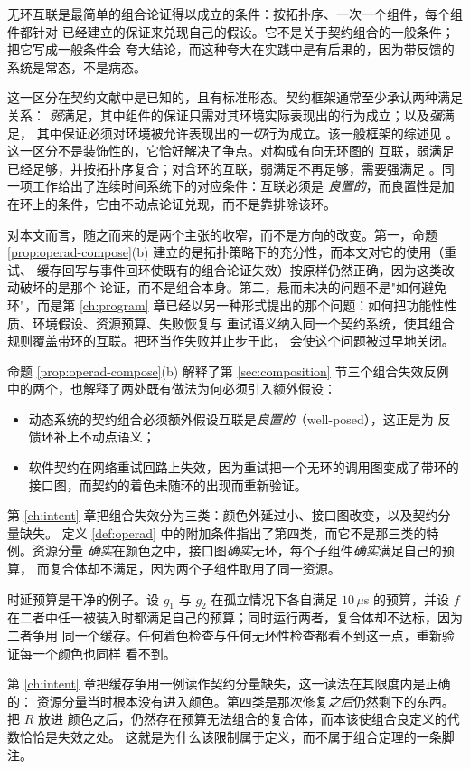 \begin{remark}\label{rmk:cycles-composable}
无环互联是最简单的组合论证得以成立的条件：按拓扑序、一次一个组件，每个组件都针对
已经建立的保证来兑现自己的假设。它不是关于契约组合的一般条件；把它写成一般条件会
夸大结论，而这种夸大在实践中是有后果的，因为带反馈的系统是常态，不是病态。

这一区分在契约文献中是已知的，且有标准形态。契约框架通常至少承认两种满足关系：
\emph{弱}满足，其中组件的保证只需对其环境实际表现出的行为成立；以及\emph{强}满足，
其中保证必须对环境被允许表现出的\emph{一切}行为成立。该一般框架的综述见
\cite{benveniste2018}。这一区分不是装饰性的，它恰好解决了争点。对构成有向无环图的
互联，弱满足已经足够，并按拓扑序复合；对含环的互联，弱满足不再足够，需要强满足
\cite{agcontracts2021}。同一项工作给出了连续时间系统下的对应条件：互联必须是
\emph{良置的}，而良置性是加在环上的条件，它由不动点论证兑现，而不是靠排除该环。

对本文而言，随之而来的是两个主张的收窄，而不是方向的改变。第一，命题
\ref{prop:operad-compose}(b) 建立的是拓扑策略下的充分性，而本文对它的使用（重试、
缓存回写与事件回环使既有的组合论证失效）按原样仍然正确，因为这类改动破坏的是那个
论证，而不是组合本身。第二，悬而未决的问题不是"如何避免环"，而是第 \ref{ch:program}
章已经以另一种形式提出的那个问题：如何把功能性性质、环境假设、资源预算、失败恢复与
重试语义纳入同一个契约系统，使其组合规则覆盖带环的互联。把环当作失败并止步于此，
会使这个问题被过早地关闭。
\end{remark}

命题 \ref{prop:operad-compose}(b) 解释了第 \ref{sec:composition} 节三个组合失效反例
中的两个，也解释了两处既有做法为何必须引入额外假设：

\begin{itemize}
\item 动态系统的契约组合必须额外假设互联是\emph{良置的}（well-posed），这正是为
      反馈环补上不动点语义；
\item 软件契约在网络重试回路上失效，因为重试把一个无环的调用图变成了带环的
      接口图，而契约的着色未随环的出现而重新验证。
\end{itemize}

\begin{remark}[第四类组合失效]\label{rmk:resource-coupling}
第 \ref{ch:intent} 章把组合失效分为三类：颜色外延过小、接口图改变，以及契约分量缺失。
定义 \ref{def:operad} 中的附加条件指出了第四类，而它不是那三类的特例。资源分量
\emph{确实}在颜色之中，接口图\emph{确实}无环，每个子组件\emph{确实}满足自己的预算，
而复合体却不满足，因为两个子组件取用了同一资源。

时延预算是干净的例子。设 $g_1$ 与 $g_2$ 在孤立情况下各自满足 $10\,\mu$s 的预算，并设
$f$ 在二者中任一被装入时都满足自己的预算；同时运行两者，复合体却不达标，因为二者争用
同一个缓存。任何着色检查与任何无环性检查都看不到这一点，重新验证每一个颜色也同样
看不到。

第 \ref{ch:intent} 章把缓存争用一例读作契约分量缺失，这一读法在其限度内是正确的：
资源分量当时根本没有进入颜色。第四类是那次修复\emph{之后}仍然剩下的东西。把 $R$ 放进
颜色之后，仍然存在预算无法组合的复合体，而本该使组合良定义的代数恰恰是失效之处。
这就是为什么该限制属于定义，而不属于组合定理的一条脚注。
\end{remark}

